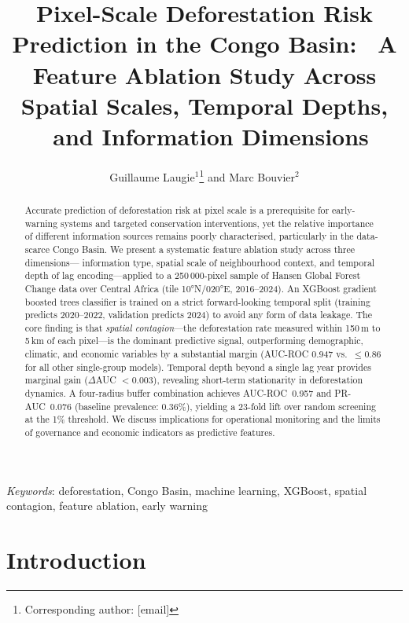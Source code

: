 \documentclass{iopart}
\begin{document}
\title{Pixel-Scale Deforestation Risk Prediction in the Congo Basin:%
\ A Feature Ablation Study Across Spatial Scales, Temporal Depths,%
\ and Information Dimensions}

\author{Guillaume Laugie$^1$\footnote{Corresponding author: [email]}
and Marc Bouvier$^2$}

\address{$^1$ Univ. Grenoble Alpes, CNRS, Grenoble, France}
\address{$^2$ NitiDae, Montpellier, France}

\begin{abstract}
Accurate prediction of deforestation risk at pixel scale is a prerequisite
for early-warning systems and targeted conservation interventions, yet the
relative importance of different information sources remains poorly
characterised, particularly in the data-scarce Congo Basin.
We present a systematic feature ablation study across three dimensions---
information type, spatial scale of neighbourhood context, and temporal
depth of lag encoding---applied to a 250\,000-pixel sample of Hansen
Global Forest Change data over Central Africa (tile 10°N/020°E, 2016--2024).
An XGBoost gradient boosted trees classifier is trained on a strict
forward-looking temporal split (training predicts 2020--2022,
validation predicts 2024) to avoid any form of data leakage.
The core finding is that \emph{spatial contagion}---the deforestation
rate measured within 150\,m to 5\,km of each pixel---is the dominant
predictive signal, outperforming demographic, climatic, and
economic variables by a substantial margin
(AUC-ROC 0.947 vs.\ $\leq$0.86 for all other single-group models).
Temporal depth beyond a single lag year provides marginal gain
($\Delta$AUC $<$0.003), revealing short-term stationarity in
deforestation dynamics. A four-radius buffer combination achieves
AUC-ROC~0.957 and PR-AUC~0.076 (baseline prevalence: 0.36\%), yielding a
23-fold lift over random screening at the 1\% threshold.
We discuss implications for operational monitoring and the limits
of governance and economic indicators as predictive features.
\end{abstract}

\noindent\textit{Keywords}: deforestation, Congo Basin, machine learning,
XGBoost, spatial contagion, feature ablation, early warning


\section{Introduction}
\end{document}
